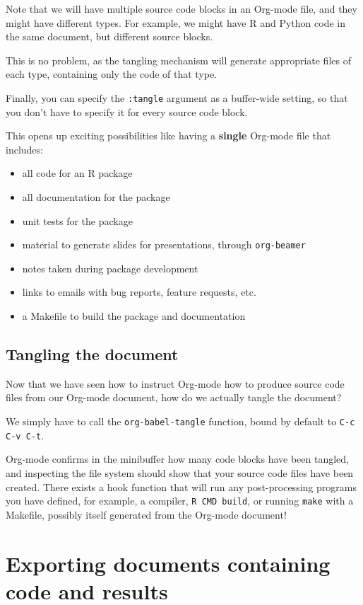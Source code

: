 \documentclass[11pt]{article}
\begin{document}
Note that we will have multiple source code blocks in an Org-mode file, and they might have different types. For example, we might have R and Python code in the same document, but different source blocks. 

This is no problem, as the tangling mechanism will generate appropriate files of each type, containing only the code of that type.

Finally, you can specify the \texttt{:tangle} argument as a buffer-wide setting, so that you don't have to specify it for every source code block.

This opens up exciting possibilities like having a \textbf{single} Org-mode file that includes:
\begin{itemize}
\item all code for an R package
\item all documentation for the package
\item unit tests for the package
\item material to generate slides for presentations, through \texttt{org-beamer}
\item notes taken during package development
\item links to emails with bug reports, feature requests, etc.
\item a Makefile to build the package and documentation
\end{itemize}
\subsection*{Tangling the document}
\label{sec-8-2}

Now that we have seen how to instruct Org-mode how to produce source code files from our Org-mode document, how do we actually tangle the document?

We simply have to call the \texttt{org-babel-tangle} function, bound by default to \texttt{C-c C-v C-t}. 

Org-mode confirms in the minibuffer how many code blocks have been tangled, and inspecting the file system should show that your source code files have been created. There exists a hook function that will run any post-processing programs you have defined, for example, a compiler, \texttt{R CMD build}, or running \texttt{make} with a Makefile, possibly itself generated from the Org-mode document!
\section*{Exporting documents containing code and results}
\label{sec-9}
\end{document}
